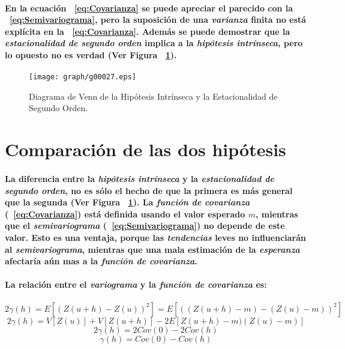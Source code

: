 \paragraph{
En la ecuación ~\ref{eq:Covarianza} se puede apreciar el parecido con la ~\ref{eq:Semivariograma}, pero la suposición de una \emph{varianza} finita no está explícita en la ~\ref{eq:Covarianza}. Además se puede demostrar que la \emph{estacionalidad de segundo orden} implica a la \emph{hipótesis intrínseca}, pero lo opuesto no es verdad (Ver Figura ~\ref{fig:DiagramaDeVennHIvsESO}).
}
\begin{figure}[ht]
\centering
\texttt{[image: graph/g00027.eps]}
\caption[La Hipótesis Intrínseca y la Estacionalidad de Segundo Orden]{Diagrama de Venn de la Hipótesis Intrínseca y la Estacionalidad de Segundo Orden.}
\label{fig:DiagramaDeVennHIvsESO}
\end{figure}



\section{Comparación de las dos hipótesis}
\paragraph{
La diferencia entre la \emph{hipótesis intrínseca} y la \emph{estacionalidad de segundo orden}, no es sólo el hecho de que la primera es más general que la segunda (Ver Figura ~\ref{fig:DiagramaDeVennHIvsESO}). La \emph{función de covarianza} (~\ref{eq:Covarianza}) está definida usando el valor esperado $m$, mientras que el \emph{semivariograma} (~\ref{eq:Semivariograma}) no depende de este valor. Esto es una ventaja, porque las \emph{tendencias} leves no influenciarán al \emph{semivariograma}, mientras que una mala estimación de la \emph{esperanza} afectaría aún mas a la \emph{función de covarianza}.
}
\paragraph{
La relación entre el \emph{variograma} y la \emph{función de covarianza} es:
}
\begin{equation}
2\gamma(h) = E[(Z(u+h) - Z(u))^2] = E[((Z(u+h)-m) - (Z(u)-m))^2]
\end{equation}
\begin{equation}
2\gamma(h) = V[Z(u)] + V[Z(u+h)] - 2E[Z(u+h)-m)(Z(u)-m)]
\end{equation}
\begin{equation}
2\gamma(h) = 2Cov(0) - 2Cov(h)
\end{equation}
\begin{equation}
\label{eq:RelacionEntreSemivariogramaYCovarianza}
\gamma(h) = Cov(0) - Cov(h)
\end{equation}
